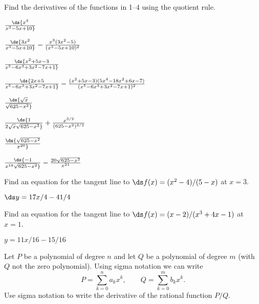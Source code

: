 \begin{exercises}

Find the derivatives of the functions in 1--4
using the quotient rule.

\twocol

\begin{exercise} $\ds {x^3\over x^3-5x+10}$
\begin{answer} $\ds {3x^2\over x^3-5x+10}-{x^3(3x^2-5)\over (x^3-5x+10)^2}$
\end{answer}\end{exercise}

\begin{exercise} $\ds {x^2+5x-3\over x^5-6x^3+3x^2-7x+1}$
\begin{answer} $\ds {2x+5\over x^5-6x^3+3x^2-7x+1}-
{(x^2+5x-3)(5x^4-18x^2+6x-7)\over(x^5-6x^3+3x^2-7x+1)^2}$
\end{answer}\end{exercise}

\ssk
\begin{exercise} $\ds {\sqrt{x}\over\sqrt{625-x^2}}$
\begin{answer} $\ds {1\over 2\sqrt{x}\sqrt{625-x^2}}+{x^{3/2}\over(625-x^2)^{3/2}}$
\end{answer}\end{exercise}

\begin{exercise} $\ds {\sqrt{625-x^2}\over x^{20}}$
\begin{answer} $\ds {-1\over x^{19}\sqrt{625-x^2}}-{20\sqrt{625-x^2}\over x^{21}}$
\end{answer}\end{exercise}

\endtwocol
\bsk

\begin{exercise} Find an equation for the tangent line to $\ds f(x) = (x^2 -
4)/(5-x)$ at $x= 3$.  
\begin{answer} $\ds y=17x/4-41/4$ 
\end{answer}\end{exercise}

\begin{exercise}  Find an equation for the tangent line to 
$\ds f(x) = (x-2)/(x^3 + 4x - 1)$ at $x=1$.
\begin{answer} $y=11x/16-15/16$
\end{answer}\end{exercise}

\begin{exercise} Let $P$ be a polynomial of degree $n$ and let $Q$ be a
polynomial of degree $m$ (with $Q$ not the zero polynomial). 
Using sigma notation we can write
$$P=\sum _{k=0 } ^n a_k x^k,\qquad
Q=\sum_{k=0}^m b_k x^k.
$$
Use sigma notation to write the derivative of the 
{\dfont rational function}
$P/Q$.
\end{exercise}


\end{exercises}
